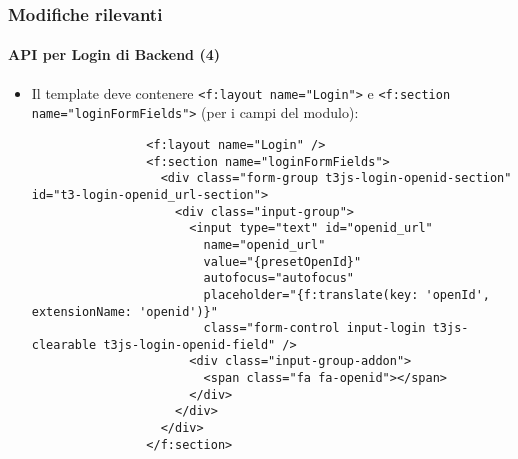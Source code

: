 \begin{frame}[fragile]
	\frametitle{Modifiche rilevanti}
	\framesubtitle{API per Login di Backend (4)}

	\lstset{basicstyle=\tiny\ttfamily}

	\begin{itemize}

		\item Il template deve contenere \texttt{<f:layout name="Login">} e
			\texttt{<f:section name="loginFormFields">} (per i campi del modulo):

			\begin{lstlisting}
				<f:layout name="Login" />
				<f:section name="loginFormFields">
				  <div class="form-group t3js-login-openid-section" id="t3-login-openid_url-section">
				    <div class="input-group">
				      <input type="text" id="openid_url"
				        name="openid_url"
				        value="{presetOpenId}"
				        autofocus="autofocus"
				        placeholder="{f:translate(key: 'openId', extensionName: 'openid')}"
				        class="form-control input-login t3js-clearable t3js-login-openid-field" />
				      <div class="input-group-addon">
				        <span class="fa fa-openid"></span>
				      </div>
				    </div>
				  </div>
				</f:section>
			\end{lstlisting}

	\end{itemize}

\end{frame}


